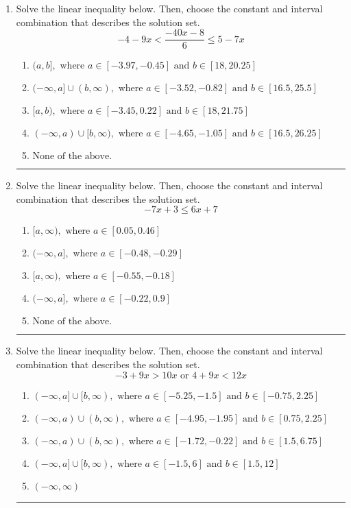\documentclass[14pt]{extbook}
\newcommand{\litem}[1]{\item#1\hspace*{-1cm}\rule{\textwidth}{0.4pt}}
\begin{document}
\begin{enumerate}
{\begin{enumerate}[label=\Alph*.]
\end{enumerate} }
\litem{
Solve the linear inequality below. Then, choose the constant and interval combination that describes the solution set.\[ -4 - 9 x < \frac{-40 x - 8}{6} \leq 5 - 7 x \]\begin{enumerate}[label=\Alph*.]
\item \( (a, b], \text{ where } a \in [-3.97, -0.45] \text{ and } b \in [18, 20.25] \)
\item \( (-\infty, a] \cup (b, \infty), \text{ where } a \in [-3.52, -0.82] \text{ and } b \in [16.5, 25.5] \)
\item \( [a, b), \text{ where } a \in [-3.45, 0.22] \text{ and } b \in [18, 21.75] \)
\item \( (-\infty, a) \cup [b, \infty), \text{ where } a \in [-4.65, -1.05] \text{ and } b \in [16.5, 26.25] \)
\item \( \text{None of the above.} \)

\end{enumerate} }
\litem{
Solve the linear inequality below. Then, choose the constant and interval combination that describes the solution set.\[ -7x + 3 \leq 6x + 7 \]\begin{enumerate}[label=\Alph*.]
\item \( [a, \infty), \text{ where } a \in [0.05, 0.46] \)
\item \( (-\infty, a], \text{ where } a \in [-0.48, -0.29] \)
\item \( [a, \infty), \text{ where } a \in [-0.55, -0.18] \)
\item \( (-\infty, a], \text{ where } a \in [-0.22, 0.9] \)
\item \( \text{None of the above}. \)

\end{enumerate} }
\litem{
Solve the linear inequality below. Then, choose the constant and interval combination that describes the solution set.\[ -3 + 9 x > 10 x \text{ or } 4 + 9 x < 12 x \]\begin{enumerate}[label=\Alph*.]
\item \( (-\infty, a] \cup [b, \infty), \text{ where } a \in [-5.25, -1.5] \text{ and } b \in [-0.75, 2.25] \)
\item \( (-\infty, a) \cup (b, \infty), \text{ where } a \in [-4.95, -1.95] \text{ and } b \in [0.75, 2.25] \)
\item \( (-\infty, a) \cup (b, \infty), \text{ where } a \in [-1.72, -0.22] \text{ and } b \in [1.5, 6.75] \)
\item \( (-\infty, a] \cup [b, \infty), \text{ where } a \in [-1.5, 6] \text{ and } b \in [1.5, 12] \)
\item \( (-\infty, \infty) \)


\end{enumerate}}
\end{enumerate}
\end{document}

